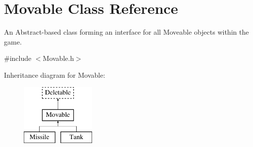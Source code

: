 \hypertarget{classMovable}{\section{Movable Class Reference}
\label{classMovable}
}


An Abstract-\/based class forming an interface for all Moveable objects within the game.  




{\ttfamily \#include $<$Movable.\-h$>$}

Inheritance diagram for Movable\-:\begin{figure}[H]
\begin{center}
\leavevmode
\includegraphics[height=3.000000cm]{classMovable}
\end{center}
\end{figure}
